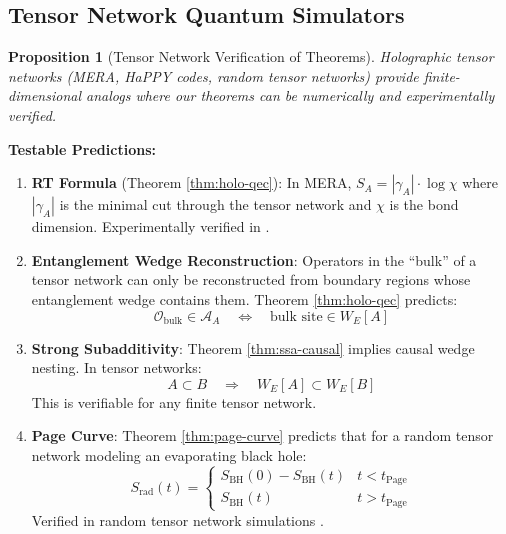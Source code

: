 \documentclass[12pt,a4paper]{article}
\newtheorem{proposition}[theorem]{Proposition}
\begin{document}
\subsection{Tensor Network Quantum Simulators}

\begin{proposition}[Tensor Network Verification of Theorems]
Holographic tensor networks (MERA, HaPPY codes, random tensor networks) provide finite-dimensional analogs where our theorems can be numerically and experimentally verified.
\end{proposition}

\textbf{Testable Predictions:}
\begin{enumerate}
    \item \textbf{RT Formula} (Theorem \ref{thm:holo-qec}): In MERA, $S_A = |\gamma_A| \cdot \log \chi$ where $|\gamma_A|$ is the minimal cut through the tensor network and $\chi$ is the bond dimension. Experimentally verified in \cite{vidal2008}.
    
    \item \textbf{Entanglement Wedge Reconstruction}: Operators in the ``bulk'' of a tensor network can only be reconstructed from boundary regions whose entanglement wedge contains them. Theorem \ref{thm:holo-qec} predicts:
    \begin{equation}
    \mathcal{O}_{\text{bulk}} \in \mathcal{A}_A \quad \Leftrightarrow \quad \text{bulk site} \in W_E[A]
    \end{equation}
    
    \item \textbf{Strong Subadditivity}: Theorem \ref{thm:ssa-causal} implies causal wedge nesting. In tensor networks:
    \begin{equation}
    A \subset B \quad \Rightarrow \quad W_E[A] \subset W_E[B]
    \end{equation}
    This is verifiable for any finite tensor network.
    
    \item \textbf{Page Curve}: Theorem \ref{thm:page-curve} predicts that for a random tensor network modeling an evaporating black hole:
    \begin{equation}
    S_{\text{rad}}(t) = \begin{cases}
    S_{\text{BH}}(0) - S_{\text{BH}}(t) & t < t_{\text{Page}} \\
    S_{\text{BH}}(t) & t > t_{\text{Page}}
    \end{cases}
    \end{equation}
    Verified in random tensor network simulations \cite{hayden2016}.
\end{enumerate}
\end{document}
